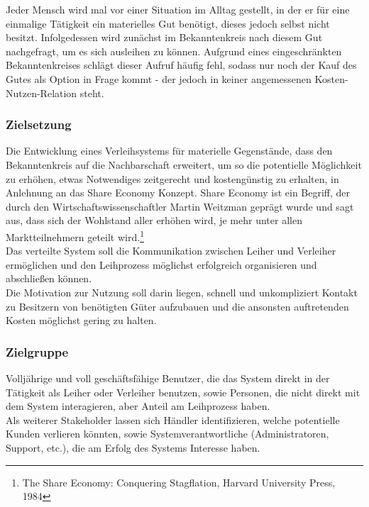 
Jeder Mensch wird mal vor einer Situation im Alltag gestellt, in der er für eine einmalige Tätigkeit ein materielles Gut benötigt, dieses jedoch selbst nicht besitzt. Infolgedessen wird zunächst im Bekanntenkreis nach diesem Gut nachgefragt, um es sich ausleihen zu können.
Aufgrund eines eingeschränkten Bekanntenkreises schlägt dieser Aufruf häufig fehl, sodass nur noch der Kauf des Gutes als Option in Frage kommt - der jedoch in keiner angemessenen Kosten-Nutzen-Relation steht.


\subsubsection{Zielsetzung}
Die Entwicklung eines Verleihsystems für materielle Gegenstände, dass den Bekanntenkreis auf die Nachbarschaft erweitert, um so die potentielle Möglichkeit zu erhöhen, etwas Notwendiges zeitgerecht und kostengünstig zu erhalten, in Anlehnung an das Share Economy Konzept.
Share Economy ist ein Begriff, der durch den Wirtschaftswissenschaftler Martin Weitzman geprägt wurde und sagt aus, dass sich der Wohlstand aller erhöhen wird, je mehr unter allen Marktteilnehmern geteilt wird.\footnote{The Share Economy: Conquering Stagflation, Harvard University Press, 1984}\\
Das verteilte System soll die Kommunikation zwischen Leiher und Verleiher ermöglichen und den Leihprozess möglichst erfolgreich organisieren und abschließen können.\\
Die Motivation zur Nutzung soll darin liegen, schnell und unkompliziert Kontakt zu Besitzern von benötigten Güter aufzubauen und die ansonsten auftretenden Kosten möglichst gering zu halten.


\subsubsection{Zielgruppe}
Volljährige und voll geschäftsfähige Benutzer, die das System direkt in der Tätigkeit als Leiher oder Verleiher benutzen, sowie Personen, die nicht direkt mit dem System interagieren, aber Anteil am Leihprozess haben.\\
Als weiterer Stakeholder lassen sich Händler identifizieren, welche potentielle Kunden verlieren könnten, sowie Systemverantwortliche (Administratoren, Support, etc.), die am Erfolg des Systems Interesse haben.


